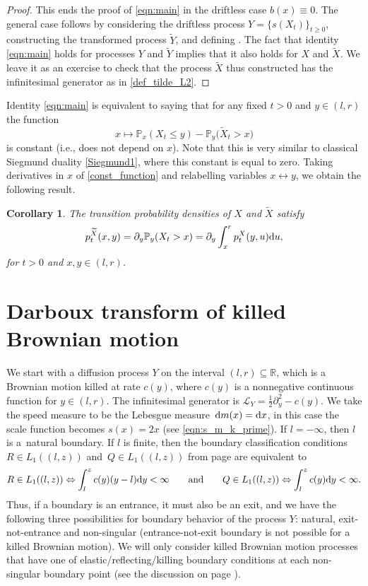 \documentclass[pdftex]{sigma}
\numberwithin{equation}{section}
\newtheorem{Corollary}[Theorem]{Corollary}
\theoremstyle{definition}
\def\L{{\mathcal L}}
\def\p{{\mathbb P}}
\def\r{{\mathbb R}}
\def\d{{\textnormal d}}
\begin{document}
\begin{proof}
This ends the proof of \eqref{eqn:main} in the driftless case $b(x)\equiv 0$. The general case follows by considering the driftless process $Y=\{s(X_t)\}_{t\ge 0}$, constructing the transformed process $\widetilde Y$, and defining . The fact that
identity \eqref{eqn:main} holds for processes $Y$ and $\widetilde Y$ implies that it also holds for $X$ and $\widetilde X$. We leave it as an exercise to check that the process $\widetilde X$ thus constructed has the infinitesimal generator as in
\eqref{def_tilde_L2}.
\end{proof}

Identity \eqref{eqn:main} is equivalent to saying that for any fixed $t>0$ and $y \in (l,r)$ the function
\begin{equation}\label{const_function}
x\mapsto \p_x (X_t\le y) - \p_y\bigl(\widetilde X_t>x\bigr)
\end{equation}
is constant (i.e., does not depend on $x$). Note that this is very similar to classical Siegmund duality \eqref{Siegmund1}, where this constant is equal to zero. Taking derivatives in $x$ of \eqref{const_function} and relabelling variables $x\leftrightarrow y$, we obtain the following result.
\begin{Corollary}\label{corollary_main}
The transition probability densities of $X$ and $\widetilde X$ satisfy
\begin{equation}\label{eqn:main2}
p^{\widetilde X}_t(x,y)=\partial_y \p_y(X_t>x)=\partial_y \int_x^r p^X_t(y,u) \d u,
\end{equation}
for $t>0$ and $x,y\in (l,r)$.
\end{Corollary}


\section{Darboux transform of killed Brownian motion}\label{section_Darboux_diffusion}


We start with a diffusion process $Y$ on the interval $(l,r) \subseteq \r$, which is a Brownian motion killed at rate $c(y)$, where $c(y)$ is a nonnegative continuous function for $y\in (l,r)$. The infinitesimal generator is $\L_Y = \frac{1}{2} \partial_y^2 -c(y)$. We take the speed measure to be the Lebesgue measure~${\d m(x)=\d x}$, in this case the scale function becomes $s(x)=2x$ (see \eqref{eqn:s_m_k_prime}). If $l=-\infty$, then $l$ is a~natural boundary. If $l$ is finite, then the boundary classification conditions $R \in L_1((l,z))$ and~${Q \in L_1((l,z))}$ from page \pageref{R_Q_L1} are equivalent to
\[
R \in L_1((l,z)) \Leftrightarrow \int_l^z c(y) (y-l) \d y < \infty\qquad  \text{and}\qquad
Q \in L_1((l,z)) \Leftrightarrow \int_l^z c(y) \d y < \infty.
\]
Thus, if a boundary is an entrance, it must also be an exit, and we have the following three possibilities for boundary behavior of the process $Y$: natural, exit-not-entrance and non-singular (entrance-not-exit boundary is not possible for a killed Brownian motion). We will only consider killed Brownian motion processes that have one of elastic/reflecting/killing boundary conditions at each non-singular boundary point (see the discussion on page \pageref{elastic_boundary_condition}).
\end{document}
